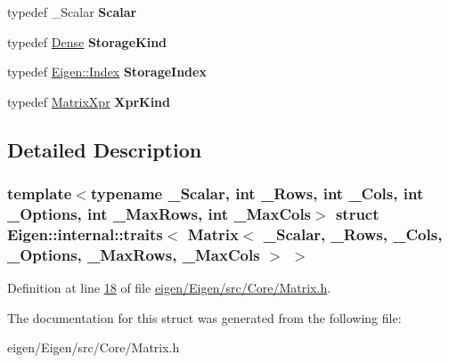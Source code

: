 \begin{DoxyCompactItemize}
typedef \+\_\+\+Scalar {\bfseries Scalar}
\item 
\mbox{\label{struct_eigen_1_1internal_1_1traits_3_01_matrix_3_01___scalar_00_01___rows_00_01___cols_00_01___o4c9772ffb3eee7280611af9a479b3583_a0ff46e6d20432a77d9091f1db6a23e3b}} 
typedef \hyperlink{struct_eigen_1_1_dense}{Dense} {\bfseries Storage\+Kind}
\item 
\mbox{\label{struct_eigen_1_1internal_1_1traits_3_01_matrix_3_01___scalar_00_01___rows_00_01___cols_00_01___o4c9772ffb3eee7280611af9a479b3583_a178d8fc56574c39a1657677cd3e28914}} 
typedef \hyperlink{namespace_eigen_a62e77e0933482dafde8fe197d9a2cfde}{Eigen\+::\+Index} {\bfseries Storage\+Index}
\item 
\mbox{\label{struct_eigen_1_1internal_1_1traits_3_01_matrix_3_01___scalar_00_01___rows_00_01___cols_00_01___o4c9772ffb3eee7280611af9a479b3583_a95750044bb96facbad2e7b54f6a5916a}} 
typedef \hyperlink{struct_eigen_1_1_matrix_xpr}{Matrix\+Xpr} {\bfseries Xpr\+Kind}
\end{DoxyCompactItemize}


\subsection{Detailed Description}
\subsubsection*{template$<$typename \+\_\+\+Scalar, int \+\_\+\+Rows, int \+\_\+\+Cols, int \+\_\+\+Options, int \+\_\+\+Max\+Rows, int \+\_\+\+Max\+Cols$>$\newline
struct Eigen\+::internal\+::traits$<$ Matrix$<$ \+\_\+\+Scalar, \+\_\+\+Rows, \+\_\+\+Cols, \+\_\+\+Options, \+\_\+\+Max\+Rows, \+\_\+\+Max\+Cols $>$ $>$}



Definition at line \hyperlink{eigen_2_eigen_2src_2_core_2_matrix_8h_source_l00018}{18} of file \hyperlink{eigen_2_eigen_2src_2_core_2_matrix_8h_source}{eigen/\+Eigen/src/\+Core/\+Matrix.\+h}.



The documentation for this struct was generated from the following file\+:\begin{DoxyCompactItemize}
\item 
eigen/\+Eigen/src/\+Core/\+Matrix.\+h\end{DoxyCompactItemize}
